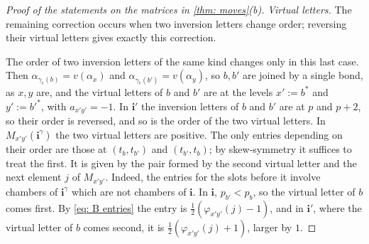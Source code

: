 \documentclass[a4paper]{amsart}
\numberwithin{equation}{section}
\theoremstyle{definition}
\theoremstyle{remark}
\newcommand{\bfi}{\mathbf{i}}
\newcommand{\cc}{\mathrm{c}}
\begin{document}
\begin{proof}[Proof of the statements on the matrices in \cref{thm: moves}(b)]
  \emph{Virtual letters.} The remaining correction occurs when two inversion letters change order; reversing their virtual letters gives exactly this correction.

  The order of two inversion letters of the same kind changes only in this last case.
  Then $\alpha_{\gamma_{\cc}(b)}=v(\alpha_x)$ and $\alpha_{\gamma_{\cc}(b')}=v(\alpha_y)$, so $b,b'$ are joined by a single bond, as $x,y$ are, and the virtual letters of $b$ and $b'$ are at the levels $x':=b^*$ and $y':=b'^*$, with $a_{x'y'}=-1$.
  In $\bfi'$ the inversion letters of $b$ and $b'$ are at $p$ and $p+2$, so their order is reversed, and so is the order of the two virtual letters.
  In $M_{x'y'}(\bfi^\gamma)$ the two virtual letters are positive.
  The only entries depending on their order are those at $(t_b,t_{b'})$ and $(t_{b'},t_b)$; by skew-symmetry it suffices to treat the first.
  It is given by the pair formed by the second virtual letter and the next element $j$ of $M_{x'y'}$.
  Indeed, the entries for the slots before it involve chambers of $\bfi^\gamma$ which are not chambers of $\bfi$.
  In $\bfi$, $p_{b'}<p_b$, so the virtual letter of $b$ comes first.
  By \eqref{eq: B entries} the entry is $\frac12(\varphi_{x'y'}(j)-1)$, and in $\bfi'$, where the virtual letter of $b$ comes second, it is $\frac12(\varphi_{x'y'}(j)+1)$, larger by $1$.
\end{proof}
\end{document}
